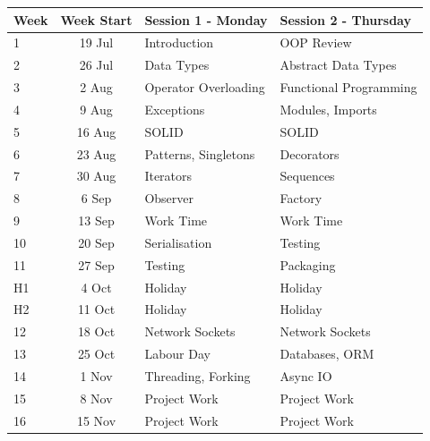 \documentclass{article}
\begin{document}
\renewcommand{\arraystretch}{1.5}
\begin{tabular}{|l|c|l|l|}
\hline
 Week     & Week Start & Session 1 - Monday                 & Session 2 - Thursday    \\ \hline
 1        & 19 Jul     & Introduction                       & OOP Review              \\ \hline
 2        & 26 Jul     & Data Types                         & Abstract Data Types     \\ \hline
 3        &  2 Aug     & Operator Overloading               & Functional Programming  \\ \hline
 4        &  9 Aug     & Exceptions                         & Modules, Imports        \\ \hline
 5        & 16 Aug     & SOLID                              & SOLID                   \\ \hline
 6        & 23 Aug     & Patterns, Singletons               & Decorators              \\ \hline
 7        & 30 Aug     & Iterators                          & Sequences               \\ \hline
 8        &  6 Sep     & Observer                           & Factory                 \\ \hline
 9        & 13 Sep     & Work Time                          & Work Time               \\ \hline
 10       & 20 Sep     & Serialisation                      & Testing                 \\ \hline
 11       & 27 Sep     & Testing                            & Packaging               \\ \hline
 H1       &  4 Oct     & Holiday                            & Holiday                 \\ \hline
 H2       & 11 Oct     & Holiday                            & Holiday                 \\ \hline
 12       & 18 Oct     & Network Sockets                    & Network Sockets         \\ \hline
 13       & 25 Oct     & Labour Day                         & Databases, ORM          \\ \hline
 14       &  1 Nov     & Threading, Forking                 & Async IO                \\ \hline
 15       &  8 Nov     & Project Work                       & Project Work            \\ \hline
 16       & 15 Nov     & Project Work                       & Project Work            \\ \hline
\end{tabular}
\end{document}
